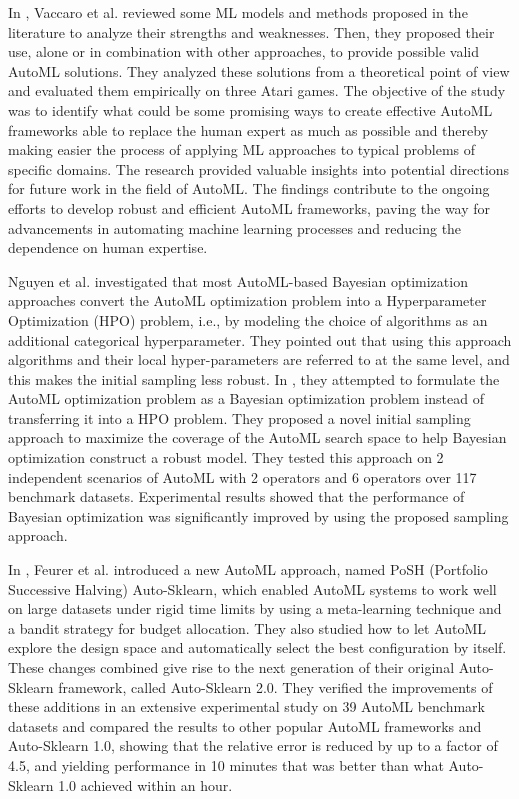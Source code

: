 In \cite{computers10010011}, Vaccaro et al. reviewed some ML models and methods proposed in the literature to analyze their strengths and weaknesses.
Then, they proposed their use, alone or in combination with other approaches, to provide possible valid AutoML solutions.
They analyzed these solutions from a theoretical point of view and evaluated them empirically on three Atari games.
The objective of the study was to identify what could be some promising ways to create effective AutoML frameworks able to replace the human expert as much as possible and thereby making easier the process of applying ML approaches to typical problems of specific domains.
The research provided valuable insights into potential directions for future work in the field of AutoML.
The findings contribute to the ongoing efforts to develop robust and efficient AutoML frameworks, paving the way for advancements in automating machine learning processes and reducing the dependence on human expertise.

Nguyen et al. investigated that most AutoML-based Bayesian optimization approaches convert the AutoML optimization problem into a Hyperparameter Optimization (HPO) problem, i.e., by modeling the choice of algorithms as an additional categorical hyperparameter.
They pointed out that using this approach algorithms and their local hyper-parameters are referred to at the same level, and this makes the initial sampling less robust.
In \cite{9660073}, they attempted to formulate the AutoML optimization problem as a Bayesian optimization problem instead of transferring it into a HPO problem.
They proposed a novel initial sampling approach to maximize the coverage of the AutoML search space to help Bayesian optimization construct a robust model.
They tested this approach on 2 independent scenarios of AutoML with 2 operators and 6 operators over 117 benchmark datasets.
Experimental results showed that the performance of Bayesian optimization was significantly improved by using the proposed sampling approach.

In \cite{Feurer2020}, Feurer et al. introduced a new AutoML approach, named PoSH (Portfolio Successive Halving) Auto-Sklearn, which enabled AutoML systems to work well on large datasets under rigid time limits by using a meta-learning technique and a bandit strategy for budget allocation.
They also studied how to let AutoML explore the design space and automatically select the best configuration by itself.
These changes combined give rise to the next generation of their original Auto-Sklearn framework, called Auto-Sklearn 2.0.
They verified the improvements of these additions in an extensive experimental study on 39 AutoML benchmark datasets and compared the results to other popular AutoML frameworks and Auto-Sklearn 1.0, showing that the relative error is reduced by up to a factor of 4.5, and yielding performance in 10 minutes that was better than what Auto-Sklearn 1.0 achieved within an hour.

